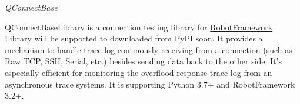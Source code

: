 %
%

\emph{QConnectBase}

QConnectBaseLibrary is a connection testing library for
\href{https://robotframework.org}{RobotFramework}. Library will be
supported to downloaded from PyPI soon. It provides a mechanism to
handle trace log continously receiving from a connection (such as Raw
TCP, SSH, Serial, etc.) besides sending data back to the other side.
It's especially efficient for monitoring the overflood response trace
log from an asynchronous trace systems. It is supporting Python 3.7+ and
RobotFramework 3.2+.
